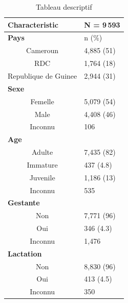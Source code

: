 \begin{table}[H]
\caption{Tableau descriptif}
\centering
\begin{tabular}{|c|l|}
\hline
\multicolumn{1}{|l|}{\textbf{Characteristic}} & \textbf{N = 9\,593} \\ \hline
\multicolumn{1}{|l|}{\textbf{Pays}} & n (\%) \\ \hline
Cameroun & 4,885 (51) \\
RDC & 1,764 (18) \\
Republique de Guinee & 2,944 (31) \\ \hline
\multicolumn{1}{|l|}{\textbf{Sexe}} & \\ \hline
Femelle & 5,079 (54) \\
Male & 4,408 (46) \\
Inconnu & 106 \\ \hline
\multicolumn{1}{|l|}{\textbf{Age}} & \\ \hline
Adulte & 7,435 (82) \\
Immature & 437 (4.8) \\
Juvenile & 1,186 (13) \\
Inconnu  & 535 \\ \hline
\multicolumn{1}{|l|}{\textbf{Gestante}} & \\ \hline
Non & 7,771 (96) \\
Oui & 346 (4.3) \\
Inconnu & 1,476 \\ \hline
\multicolumn{1}{|l|}{\textbf{Lactation}} & \\ \hline
Non & 8,830 (96) \\
Oui & 413 (4.5) \\
Inconnu & 350 \\ \hline
\end{tabular}
\end{table}
